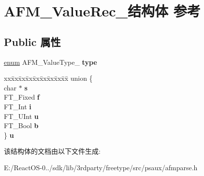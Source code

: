 \hypertarget{struct_a_f_m___value_rec__}{}\section{A\+F\+M\+\_\+\+Value\+Rec\+\_\+结构体 参考}
\label{struct_a_f_m___value_rec__}
\subsection*{Public 属性}
\begin{DoxyCompactItemize}
\item 
\mbox{\label{struct_a_f_m___value_rec___a874f0499053b86ebdf2a5e527fe51438}} 
\hyperlink{interfaceenum}{enum} A\+F\+M\+\_\+\+Value\+Type\+\_\+ {\bfseries type}
\item 
\mbox{\label{struct_a_f_m___value_rec___a982ea639679cea709ddf4e8dcea95363}} 
\begin{tabbing}
xx\=xx\=xx\=xx\=xx\=xx\=xx\=xx\=xx\=\kill
union \{\\
\>char $\ast$ {\bfseries s}\\
\>FT\_Fixed {\bfseries f}\\
\>FT\_Int {\bfseries i}\\
\>FT\_UInt {\bfseries u}\\
\>FT\_Bool {\bfseries b}\\
\} {\bfseries u}\\

\end{tabbing}\end{DoxyCompactItemize}


该结构体的文档由以下文件生成\+:\begin{DoxyCompactItemize}
\item 
E\+:/\+React\+O\+S-\/0../sdk/lib/3rdparty/freetype/src/psaux/afmparse.\+h\end{DoxyCompactItemize}
